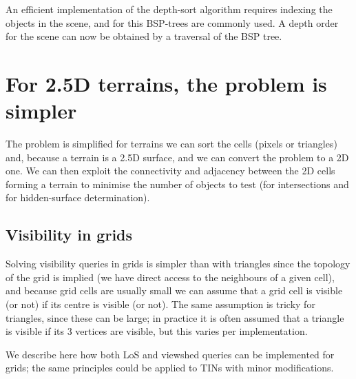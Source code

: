 
An efficient implementation of the depth-sort algorithm requires indexing the objects in the scene, and for this BSP-trees are commonly used.
A depth order for the scene can now be obtained by a traversal of the BSP tree.



%
\section[2.5D terrains are simple]{For 2.5D terrains, the problem is simpler}

The problem is simplified for terrains we can sort the cells (pixels or triangles) and, because a terrain is a 2.5D surface, and we can convert the problem to a 2D one.
We can then exploit the connectivity and adjacency between the 2D cells forming a terrain to minimise the number of objects to test (for intersections and for hidden-surface determination).


%
\subsection{Visibility in grids}

Solving visibility queries in grids is simpler than with triangles since the topology of the grid is implied (we have direct access to the neighbours of a given cell), and because grid cells are usually small we can assume that a grid cell is visible (or not) if its centre is visible (or not).
The same assumption is tricky for triangles, since these can be large; in practice it is often assumed that a triangle is visible if its 3 vertices are visible, but this varies per implementation.

%

We describe here how both LoS and viewshed queries can be implemented for grids; the same principles could be applied to TINs with minor modifications.


